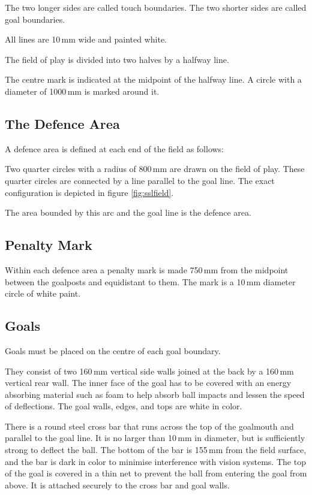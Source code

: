 The two longer sides are called touch boundaries.
The two shorter sides are called goal boundaries.

All lines are 10\,mm wide and painted white.

The field of play is divided into two halves by a halfway line.

The centre mark is indicated at the midpoint of the halfway line.
A circle with a diameter of 1000\,mm is marked around it.

\subsection{The Defence Area}
A defence area is defined at each end of the field as follows:

Two quarter circles with a radius of 800\,mm are drawn on the field of play.
These quarter circles are connected by a line parallel to the goal line.
The exact configuration is depicted in figure \ref{fig:sslfield}.

The area bounded by this arc and the goal line is the defence area.

\subsection{Penalty Mark}
Within each defence area a penalty mark is made 750\,mm from the midpoint between the goalposts and equidistant to them.
The mark is a 10\,mm diameter circle of white paint.

\subsection{Goals}
Goals must be placed on the centre of each goal boundary.

They consist of two 160\,mm vertical side walls joined at the back by a 160\,mm vertical rear wall.
The inner face of the goal has to be covered with an energy absorbing material such as foam to help absorb ball impacts and lessen the speed of deflections.
The goal walls, edges, and tops are white in color.

There is a round steel cross bar that runs across the top of the goalmouth and parallel to the goal line.
It is no larger than 10\,mm in diameter, but is sufficiently strong to deflect the ball.
The bottom of the bar is 155\,mm from the field surface, and the bar is dark in color to minimise interference with vision systems.
The top of the goal is covered in a thin net to prevent the ball from entering the goal from above.
It is attached securely to the cross bar and goal walls.

